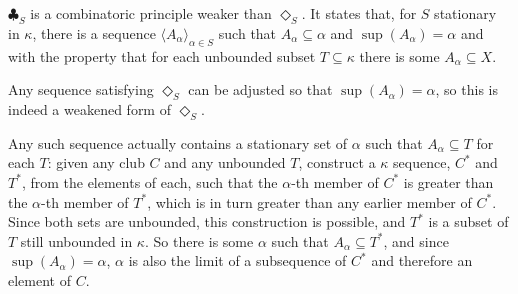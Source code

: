 \documentclass[12pt]{article}
\begin{document}
$\clubsuit_S$ is a combinatoric principle weaker than $\Diamond_S$.  It states that, for $S$ stationary in $\kappa$, there is a sequence $\langle A_\alpha\rangle_{\alpha\in S}$ such that $A_\alpha\subseteq\alpha$ and $\operatorname{sup}(A_\alpha)=\alpha$ and with the property that for each unbounded subset $T\subseteq\kappa$ there is some $A_\alpha\subseteq X$.

Any sequence satisfying $\Diamond_S$ can be adjusted so that $\operatorname{sup}(A_\alpha)=\alpha$, so this is indeed a weakened form of $\Diamond_S$.

Any such sequence actually contains a stationary set of $\alpha$ such that $A_\alpha\subseteq T$ for each $T$: given any club $C$ and any unbounded $T$, construct a $\kappa$ sequence, $C^*$ and $T^*$, from the elements of each, such that the $\alpha$-th member of $C^*$ is greater than the $\alpha$-th member of $T^*$, which is in turn greater than any earlier member of $C^*$.  Since both sets are unbounded, this construction is possible, and $T^*$ is a subset of $T$ still unbounded in $\kappa$.  So there is some $\alpha$ such that $A_\alpha\subseteq T^*$, and since $\operatorname{sup}(A_\alpha)=\alpha$, $\alpha$ is also the limit of a subsequence of $C^*$ and therefore an element of $C$.
\end{document}
